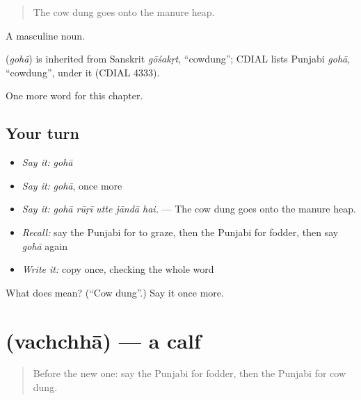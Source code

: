 \begin{quote}
The cow dung goes onto the manure heap.
\end{quote}

A masculine noun.

\begin{cousinweb}
\textbf{} (\emph{gohā}) is inherited from Sanskrit \emph{gōśakṛt}, \textquotedblleft{}cowdung\textquotedblright{}; CDIAL lists Punjabi \emph{gohā}, \textquotedblleft{}cowdung\textquotedblright{}, under it (CDIAL 4333).
\end{cousinweb}

\begin{grammarlens}[title={What you've built}]
One more word for this chapter.
\end{grammarlens}

\subsection*{Your turn}
\begin{itemize}
\raggedright
  \item \emph{Say it:} \emph{gohā}
  \item \emph{Say it:} \emph{gohā}, once more
  \item \emph{Say it:} \emph{gohā rūṛī utte jāndā hai.} — The cow dung goes onto the manure heap.
  \item \emph{Recall:} say the Punjabi for to graze, then the Punjabi for fodder, then say \emph{gohā} again
  \item \emph{Write it:} copy \textbf{} once, checking the whole word
\end{itemize}

\begin{tcolorbox}[breakable,colback=teal!4,colframe=teal!35!black,title={Before you move on}]
What does  mean? (\textquotedblleft{}Cow dung\textquotedblright{}.) Say it once more.
\end{tcolorbox}
\section[\texorpdfstring{\pa{ਵੱਛਾ} (vachchhā)}{ਵੱਛਾ (vachchhā)}]{ (vachchhā) — a calf}

\label{lesson:PA-C308-vachchha}



\begin{quote}
Before the new one: say the Punjabi for fodder, then the Punjabi for cow dung.
\end{quote}

